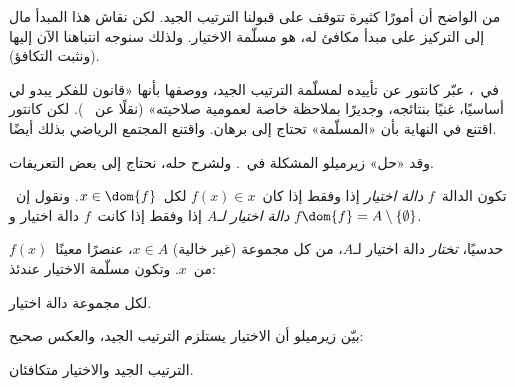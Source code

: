 \documentclass[../../../include/open-logic-section]{subfiles}
\begin{document}

من الواضح أن أمورًا كثيرة تتوقف على قبولنا الترتيب الجيد. لكن نقاش
هذا المبدأ مال إلى التركيز على مبدأ مكافئ له، هو مسلّمة الاختيار.
ولذلك سنوجه انتباهنا الآن إليها (ونثبت التكافؤ).

في~\citeyear{Cantor1883}، عبّر كانتور عن تأييده لمسلّمة الترتيب الجيد،
ووصفها بأنها «قانون للفكر يبدو لي أساسيًا، غنيًا بنتائجه، وجديرًا
بملاحظة خاصة لعمومية صلاحيته» (نقلًا عن~\citeauthor{Potter2004}
\citeyear[p.~243]{Potter2004}). لكن كانتور اقتنع في النهاية بأن
«المسلّمة» تحتاج إلى برهان. واقتنع المجتمع الرياضي بذلك أيضًا.

وقد «حل» زيرميلو المشكلة في~\citeyear{Zermelo1904}. ولشرح حله، نحتاج
إلى بعض التعريفات.

\begin{defn}
تكون الدالة~$f$ \emph{دالة اختيار} إذا وفقط إذا كان~$f(x) \in x$
لكل~$x \in \dom{f}$. ونقول إن~$f$ \emph{دالة اختيار لـ$A$} إذا وفقط
إذا كانت~$f$ دالة اختيار و$\dom{f} = A \setminus \{\emptyset\}$.
\end{defn}

حدسيًا، \emph{تختار} دالة اختيار لـ$A$، من كل مجموعة (غير خالية)
$x \in A$، عنصرًا معينًا~$f(x)$ من~$x$. وتكون مسلّمة الاختيار عندئذ:

\begin{axiom}[الاختيار]
	لكل مجموعة دالة اختيار.
\end{axiom}

بيّن زيرميلو أن الاختيار يستلزم الترتيب الجيد، والعكس صحيح:

\begin{thm}[في $\ZF$]
الترتيب الجيد والاختيار متكافئان.
\end{thm}
\end{document}
